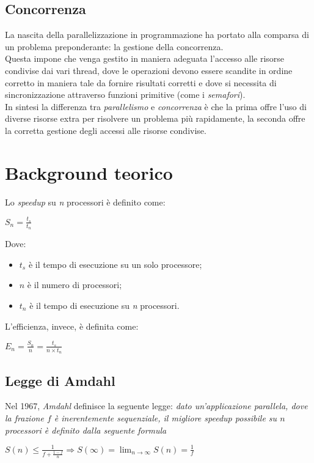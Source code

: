 \subsection{Concorrenza}
La nascita della parallelizzazione in programmazione ha portato alla comparsa di un problema preponderante: la gestione della concorrenza. \\
Questa impone che venga gestito in maniera adeguata l'accesso alle risorse condivise dai vari thread, dove le operazioni devono essere scandite in ordine corretto in maniera tale da fornire risultati corretti e dove si necessita di sincronizzazione attraverso funzioni primitive (come i \textit{semafori}). \\
In sintesi la differenza tra \textit{parallelismo} e \textit{concorrenza} è che la prima offre l'uso di diverse risorse extra per risolvere un problema più rapidamente, la seconda offre la corretta gestione degli accessi alle risorse condivise.

\section{Background teorico}
Lo \textit{speedup} su \textit{n} processori è definito come:
\begin{center}
	$S_{n} = \frac{t_{s}}{t_{n}}$
\end{center}
Dove:
\begin{itemize}
	\item $t_s$ è il tempo di esecuzione su un solo processore;
	\item $n$ è il numero di processori;
	\item $t_n$ è il tempo di esecuzione su \textit{n} processori.
\end{itemize}
L'efficienza, invece, è definita come:
\begin{center}
	$E_{n} = \frac{S_{n}}{n} = \frac{t_{s}}{n\times t_{n}}$ \\
\end{center}

\subsection{Legge di Amdahl}
Nel 1967, \textit{Amdahl} definisce la seguente legge: \textit{dato un'applicazione parallela, dove la frazione $f$ è inerentemente sequenziale, il migliore speedup possibile su $n$ processori è definito dalla seguente formula}
\begin{center}
	$S(n) \leq \frac{1}{f + \frac{1 - f}{n}} \Rightarrow S(\infty) = \lim_{n\rightarrow \infty} S(n) = \frac{1}{f} $
\end{center}

